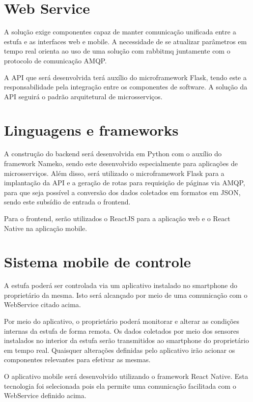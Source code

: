 \section{Web Service}

A solução exige componentes capaz de manter comunicação unificada entre a estufa e as interfaces web e mobile. A necessidade de se atualizar parâmetros em tempo real orienta ao uso de uma solução com rabbitmq juntamente com o protocolo de comunicação AMQP. 

A API que será desenvolvida terá auxílio do microframework Flask, tendo este a responsabilidade pela integração entre os componentes de software. A solução da API seguirá o padrão arquitetural de microsserviços. 

\section{Linguagens e frameworks}

A construção do backend será desenvolvida em Python com o auxílio do framework Nameko, sendo este desenvolvido especialmente para aplicações de microsserviços. Além disso, será utilizado o microframework Flask para a implantação da API e a geração de rotas para requisição de páginas via AMQP, para que seja possível a conversão dos dados coletados em formatos em JSON, sendo este subsídio de entrada o frontend. \cite{rocha}

Para o frontend, serão utilizados o ReactJS para a aplicação web e o React Native na aplicação mobile. 

\section{Sistema mobile de controle}

A estufa poderá ser controlada via um aplicativo instalado no smartphone do proprietário da mesma. Isto será alcançado por meio de uma comunicação com o WebService citado acima.

Por meio do aplicativo, o proprietário poderá monitorar e alterar as condições internas da estufa de forma remota. Os dados coletados por meio dos sensores instalados no interior da estufa serão transmitidos ao smartphone do proprietário em tempo real. Quaisquer alterações definidas pelo aplicativo irão acionar os componentes relevantes para efetivar as mesmas.

O aplicativo mobile será desenvolvido utilizando o framework React Native. Esta tecnologia foi selecionada pois ela permite uma comunicação facilitada com o WebService definido acima.

